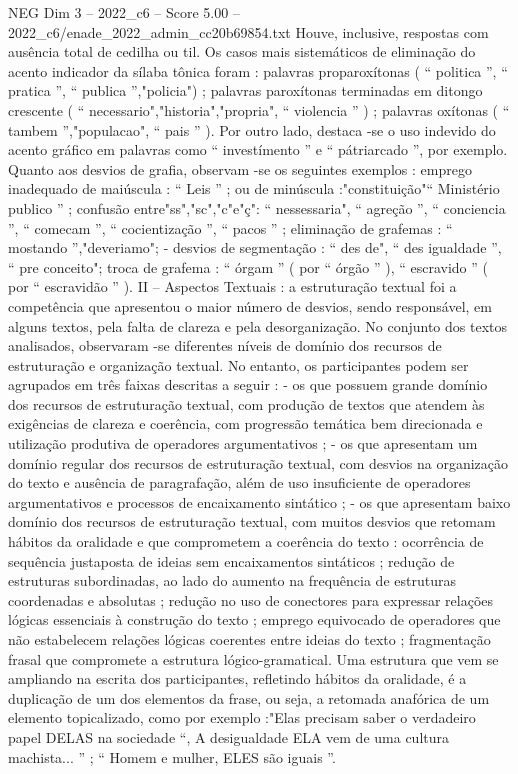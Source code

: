 \begin{textsample}{NEG Dim 3 – 2022\_c6 – Score 5.00 – 2022\_c6/enade\_2022\_admin\_cc20b69854.txt}
Houve, inclusive, respostas com ausência total de cedilha ou til.
Os casos mais sistemáticos de eliminação do acento indicador da sílaba tônica foram : palavras proparoxítonas ( “ politica ”, “ pratica ”, “ publica ”,"policia") ; palavras paroxítonas terminadas em ditongo crescente ( “ necessario","historia","propria", “ violencia ” ) ; palavras oxítonas ( “ tambem ”,"populacao", “ pais ” ).
Por outro lado, destaca -se o uso indevido do acento gráfico em palavras como “ investímento ” e “ pátriarcado ”, por exemplo.
Quanto aos desvios de grafia, observam -se os seguintes exemplos : emprego inadequado de maiúscula : “ Leis ” ; ou de minúscula :"constituição"“ Ministério publico ” ; confusão entre"ss","sc","c"e"ç": “ nessessaria", “ agreção ”, “ conciencia ”, “ comecam ”, “ cocientização ”, “ pacos ” ; eliminação de grafemas : “ mostando ”,"deveriamo"; - desvios de segmentação : “ des de", “ des igualdade ”, “ pre conceito"; troca de grafema : “ órgam ” ( por “ órgão ” ), “ escravido ” ( por “ escravidão ” ).
II – Aspectos Textuais : a estruturação textual foi a competência que apresentou o maior número de desvios, sendo responsável, em alguns textos, pela falta de clareza e pela desorganização.
No conjunto dos textos analisados, observaram -se diferentes níveis de domínio dos recursos de estruturação e organização textual.
No entanto, os participantes podem ser agrupados em três faixas descritas a seguir : - os que possuem grande domínio dos recursos de estruturação textual, com produção de textos que atendem às exigências de clareza e coerência, com progressão temática bem direcionada e utilização produtiva de operadores argumentativos ; - os que apresentam um domínio regular dos recursos de estruturação textual, com desvios na organização do texto e ausência de paragrafação, além de uso insuficiente de operadores argumentativos e processos de encaixamento sintático ; - os que apresentam baixo domínio dos recursos de estruturação textual, com muitos desvios que retomam hábitos da oralidade e que comprometem a coerência do texto : ocorrência de sequência justaposta de ideias sem encaixamentos sintáticos ; redução de estruturas subordinadas, ao lado do aumento na frequência de estruturas coordenadas e absolutas ; redução no uso de conectores para expressar relações lógicas essenciais à construção do texto ; emprego equivocado de operadores que não estabelecem relações lógicas coerentes entre ideias do texto ; fragmentação frasal que compromete a estrutura lógico-gramatical.
Uma estrutura que vem se ampliando na escrita dos participantes, refletindo hábitos da oralidade, é a duplicação de um dos elementos da frase, ou seja, a retomada anafórica de um elemento topicalizado, como por exemplo :"Elas precisam saber o verdadeiro papel DELAS na sociedade “, A desigualdade ELA vem de uma cultura machista... ” ; “ Homem e mulher, ELES são iguais ”.

\end{textsample}
